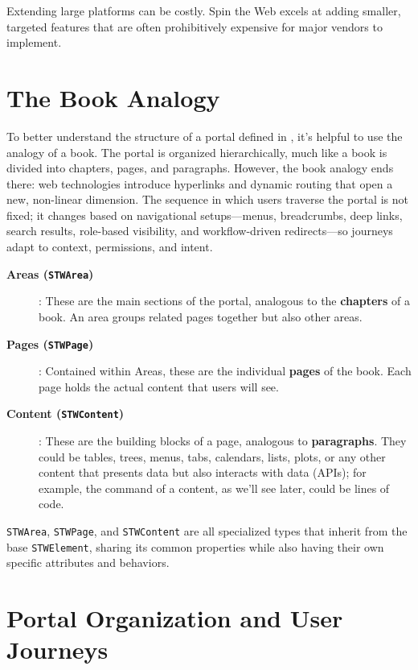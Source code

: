 Extending large platforms can be costly. Spin the Web excels at adding smaller, targeted features that are often prohibitively expensive for major vendors to implement.

\section{The Book Analogy}
\label{sec:book-analogy}

To better understand the structure of a portal defined in \wbdl{}, it's helpful to use the analogy of a book. The portal is organized hierarchically, much like a book is divided into chapters, pages, and paragraphs. However, the book analogy ends there: web technologies introduce hyperlinks and dynamic routing that open a new, non-linear dimension. The sequence in which users traverse the portal is not fixed; it changes based on navigational setups---menus, breadcrumbs, deep links, search results, role-based visibility, and workflow-driven redirects---so journeys adapt to context, permissions, and intent.

\begin{description}
\item[\textbf{Areas (\texttt{STWArea})}]: These are the main sections of the portal, analogous to the \textbf{chapters} of a book. An area groups related pages together but also other areas.
\item[\textbf{Pages (\texttt{STWPage})}]: Contained within Areas, these are the individual \textbf{pages} of the book. Each page holds the actual content that users will see.
\item[\textbf{Content (\texttt{STWContent})}]: These are the building blocks of a page, analogous to \textbf{paragraphs}. They could be tables, trees, menus, tabs, calendars, lists, plots, or any other content that presents data but also interacts with data (APIs); for example, the command of a content, as we'll see later, could be lines of code. 
\end{description}

	\texttt{STWArea}, \texttt{STWPage}, and \texttt{STWContent} are all specialized types that inherit from the base \texttt{STWElement}, sharing its common properties while also having their own specific attributes and behaviors.

\section{Portal Organization and User Journeys}
\label{sec:user-journeys}

